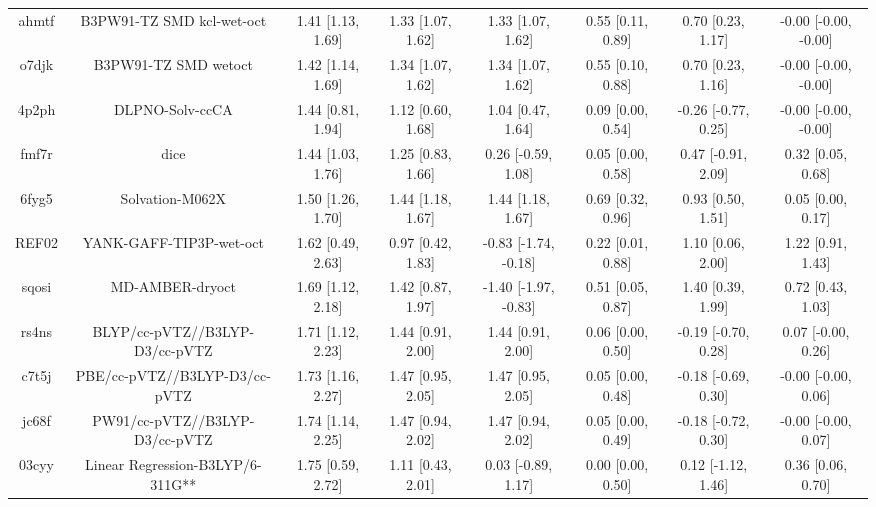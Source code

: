 \documentclass{article}
\begin{document}
\begin{center}
\begin{longtable}{|cccccccc|}
 ahmtf &                          B3PW91-TZ SMD kcl-wet-oct &  1.41 [1.13, 1.69] &  1.33 [1.07, 1.62] &     1.33 [1.07, 1.62] &  0.55 [0.11, 0.89] &    0.70 [0.23, 1.17] &  -0.00 [-0.00, -0.00] \\
 o7djk &                               B3PW91-TZ SMD wetoct &  1.42 [1.14, 1.69] &  1.34 [1.07, 1.62] &     1.34 [1.07, 1.62] &  0.55 [0.10, 0.88] &    0.70 [0.23, 1.16] &  -0.00 [-0.00, -0.00] \\
 4p2ph &                                    DLPNO-Solv-ccCA &  1.44 [0.81, 1.94] &  1.12 [0.60, 1.68] &     1.04 [0.47, 1.64] &  0.09 [0.00, 0.54] &  -0.26 [-0.77, 0.25] &  -0.00 [-0.00, -0.00] \\
 fmf7r &                                               dice &  1.44 [1.03, 1.76] &  1.25 [0.83, 1.66] &    0.26 [-0.59, 1.08] &  0.05 [0.00, 0.58] &   0.47 [-0.91, 2.09] &     0.32 [0.05, 0.68] \\
 6fyg5 &                                    Solvation-M062X &  1.50 [1.26, 1.70] &  1.44 [1.18, 1.67] &     1.44 [1.18, 1.67] &  0.69 [0.32, 0.96] &    0.93 [0.50, 1.51] &     0.05 [0.00, 0.17] \\
 REF02 &                            YANK-GAFF-TIP3P-wet-oct &  1.62 [0.49, 2.63] &  0.97 [0.42, 1.83] &  -0.83 [-1.74, -0.18] &  0.22 [0.01, 0.88] &    1.10 [0.06, 2.00] &     1.22 [0.91, 1.43] \\
 sqosi &                                    MD-AMBER-dryoct &  1.69 [1.12, 2.18] &  1.42 [0.87, 1.97] &  -1.40 [-1.97, -0.83] &  0.51 [0.05, 0.87] &    1.40 [0.39, 1.99] &     0.72 [0.43, 1.03] \\
 rs4ns &                     BLYP/cc-pVTZ//B3LYP-D3/cc-pVTZ &  1.71 [1.12, 2.23] &  1.44 [0.91, 2.00] &     1.44 [0.91, 2.00] &  0.06 [0.00, 0.50] &  -0.19 [-0.70, 0.28] &    0.07 [-0.00, 0.26] \\
 c7t5j &                      PBE/cc-pVTZ//B3LYP-D3/cc-pVTZ &  1.73 [1.16, 2.27] &  1.47 [0.95, 2.05] &     1.47 [0.95, 2.05] &  0.05 [0.00, 0.48] &  -0.18 [-0.69, 0.30] &   -0.00 [-0.00, 0.06] \\
 jc68f &                     PW91/cc-pVTZ//B3LYP-D3/cc-pVTZ &  1.74 [1.14, 2.25] &  1.47 [0.94, 2.02] &     1.47 [0.94, 2.02] &  0.05 [0.00, 0.49] &  -0.18 [-0.72, 0.30] &   -0.00 [-0.00, 0.07] \\
 03cyy &                   Linear Regression-B3LYP/6-311G** &  1.75 [0.59, 2.72] &  1.11 [0.43, 2.01] &    0.03 [-0.89, 1.17] &  0.00 [0.00, 0.50] &   0.12 [-1.12, 1.46] &     0.36 [0.06, 0.70] \\

\end{longtable}
\end{center}
\end{document}
